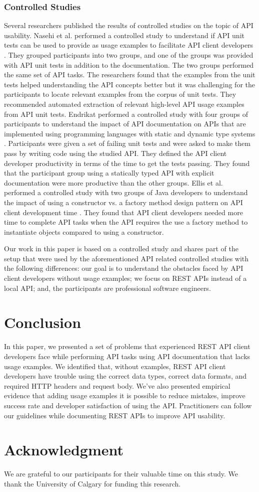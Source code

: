 \documentclass[conference]{IEEEtran}
\begin{document}
\subsubsection{Controlled Studies}
Several researchers published the results of controlled studies on the topic of API usability. Nasehi et al. performed a controlled study to understand if API unit tests can be used to provide as usage examples to facilitate API client developers \cite{5609553}. They grouped participants into two groups, and one of the groups was provided with API unit tests in addition to the documentation. The two groups performed the same set of API tasks. The researchers found that the examples from the unit tests helped understanding the API concepts better but it was challenging for the participants to locate relevant examples from the corpus of unit tests. They recommended automated extraction of relevant high-level API usage examples from API unit tests. Endrikat performed a controlled study with four groups of participants to understand the impact of API documentation on APIs that are implemented using programming languages with static and dynamic type systems \cite{Endrikat:2014:ADS:2568225.2568299}. Participants were given a set of failing unit tests and were asked to make them pass by writing code using the studied API. They defined the API client developer productivity in terms of the time to get the tests passing. They found that the participant group using a statically typed API with explicit documentation were more productive than the other groups. Ellis et al. performed a controlled study with two groups of Java developers to understand the impact of using a constructor vs. a factory method design pattern on API client development time \cite{Ellis:2007:FPA:1248820.1248863}. They found that API client developers needed more time to complete API tasks when the API requires the use a factory method to instantiate objects compared to using a constructor.

Our work in this paper is based on a controlled study and shares part of the setup that were used by the aforementioned API related controlled studies with the following differences: our goal is to understand the obstacles faced by API client developers without usage examples;  we focus on REST APIs instead of a local API; and, the participants are professional software engineers.

\section{Conclusion}
In this paper, we presented a set of problems that experienced REST API client developers face while performing API tasks using API documentation that lacks usage examples. We identified that, without examples, REST API client developers have trouble using the correct data types, correct data formats, and required HTTP headers and request body. We've also presented empirical evidence that adding usage examples it is possible to reduce mistakes, improve success rate and developer satisfaction of using the API. Practitioners can follow our guidelines while documenting REST APIs to improve API usability.

\section*{Acknowledgment}
We are grateful to our participants for their valuable time on this study. We thank the University of Calgary for funding this research.



\end{document}
